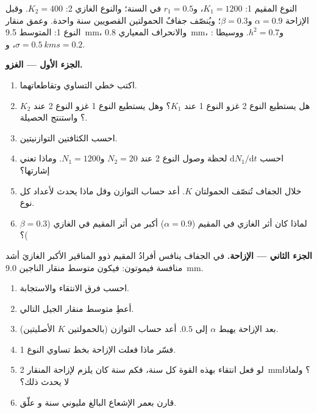 \begin{problem}
\label{pb:b2:speciation:1}
النوع المقيم 1: $K_1 = 1200$، و$r_1 = 0.5$ في السنة؛ والنوع
الغازي 2: $K_2 = 400$. وقبل الإزاحة $\alpha = 0.9$ و$\beta =
0.3$؛ ويُنصّف جفافٌ الحمولتين القصويين سنة واحدة. وعمق منقار
النوع 1: المتوسط \qty{9.5}{mm}، والانحراف المعياري
\qty{0.8}{mm}، و$h^{2} = 0.7$. ووسيطا : $\sigma =
\qty{0.5}{km}$، و$s = 0.2$.

\medskip
\noindent\textbf{الجزء الأول --- الغزو.}
\begin{enumerate}
  \item اكتب خطي التساوي وتقاطعاتهما.
  \item هل يستطيع النوع 2 غزو النوع 1 عند $K_1$؟ وهل يستطيع النوع 1
        غزو النوع 2 عند $K_2$؟ واستنتج الحصيلة.
  \item احسب الكثافتين التوازنيتين.
  \item احسب $\mathrm{d}N_1/\mathrm{d}t$ لحظة وصول النوع 2
        عند $N_2 = 20$ و$N_1 = 1200$. وماذا تعني إشارتها؟
  \item خلال الجفاف تُنصّف الحمولتان $K$. أعد حساب
        التوازن وقل ماذا يحدث لأعداد كل نوع.
  \item لماذا كان أثر الغازي في المقيم ($\alpha = 0.9$)
        أكبر من أثر المقيم في الغازي ($\beta = 0.3$)؟
\end{enumerate}

\medskip
\noindent\textbf{الجزء الثاني --- الإزاحة.}
في الجفاف ينافس أفرادُ المقيم ذوو المناقير الأكبر
الغازيَ أشد منافسة فيموتون: فيكون متوسط منقار الناجين
\qty{9.0}{mm}.
\begin{enumerate}[resume]
  \item احسب فرق الانتقاء والاستجابة.
  \item أعطِ متوسط منقار الجيل التالي.
  \item بعد الإزاحة يهبط $\alpha$ إلى $0.5$. أعد حساب
        التوازن (بالحمولتين $K$ الأصليتين).
  \item فسّر ماذا فعلت الإزاحة بخط تساوي النوع 1.
  \item لو فعل انتقاء بهذه القوة كل سنة، فكم
        سنة كان يلزم لإزاحة المنقار \qty{2}{mm}؟ ولماذا
        لا يحدث ذلك؟
  \item قارن بعمر الإشعاع البالغ مليوني سنة و
        علّق.
\end{enumerate}


\end{problem}
